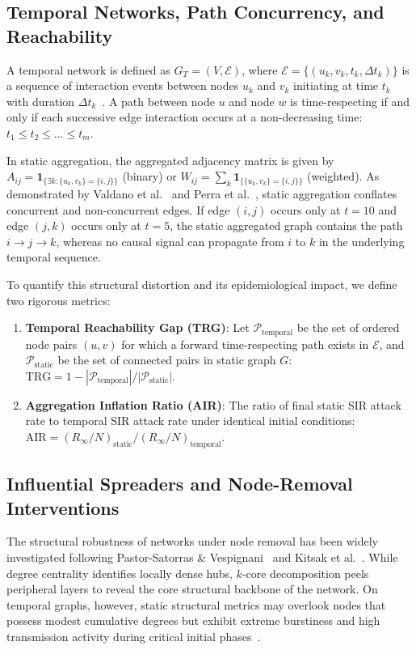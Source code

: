 \documentclass[conference]{IEEEtran}
\begin{document}
\subsection{Temporal Networks, Path Concurrency, and Reachability}
A temporal network is defined as $G_T = (V, \mathcal{E})$, where $\mathcal{E} = \{(u_k, v_k, t_k, \Delta t_k)\}$ is a sequence of interaction events between nodes $u_k$ and $v_k$ initiating at time $t_k$ with duration $\Delta t_k$~\cite{holme2012temporal}. A path between node $u$ and node $w$ is time-respecting if and only if each successive edge interaction occurs at a non-decreasing time: $t_1 \le t_2 \le \dots \le t_m$. 

In static aggregation, the aggregated adjacency matrix is given by $A_{ij} = \mathbf{1}_{\{\exists k : \{u_k, v_k\} = \{i, j\}\}}$ (binary) or $W_{ij} = \sum_k \mathbf{1}_{\{\{u_k, v_k\} = \{i, j\}\}}$ (weighted). As demonstrated by Valdano et al.~\cite{valdano2015analytical} and Perra et al.~\cite{perra2012activity}, static aggregation conflates concurrent and non-concurrent edges. If edge $(i, j)$ occurs only at $t=10$ and edge $(j, k)$ occurs only at $t=5$, the static aggregated graph contains the path $i \to j \to k$, whereas no causal signal can propagate from $i$ to $k$ in the underlying temporal sequence.

To quantify this structural distortion and its epidemiological impact, we define two rigorous metrics:
\begin{enumerate}
    \item \textbf{Temporal Reachability Gap (TRG)}: Let $\mathcal{P}_{\text{temporal}}$ be the set of ordered node pairs $(u, v)$ for which a forward time-respecting path exists in $\mathcal{E}$, and $\mathcal{P}_{\text{static}}$ be the set of connected pairs in static graph $G$:
    $\text{TRG} = 1 - |\mathcal{P}_{\text{temporal}}| / |\mathcal{P}_{\text{static}}|$.
    \item \textbf{Aggregation Inflation Ratio (AIR)}: The ratio of final static SIR attack rate to temporal SIR attack rate under identical initial conditions:
    $\text{AIR} = (R_\infty / N)_{\text{static}} / (R_\infty / N)_{\text{temporal}}$.
\end{enumerate}

\subsection{Influential Spreaders and Node-Removal Interventions}
The structural robustness of networks under node removal has been widely investigated following Pastor-Satorras \& Vespignani~\cite{pastorsatorras2001epidemic} and Kitsak et al.~\cite{kitsak2010identification}. While degree centrality identifies locally dense hubs, $k$-core decomposition peels peripheral layers to reveal the core structural backbone of the network. On temporal graphs, however, static structural metrics may overlook nodes that possess modest cumulative degrees but exhibit extreme burstiness and high transmission activity during critical initial phases~\cite{karsai2011small, holme2012temporal}.
\end{document}
